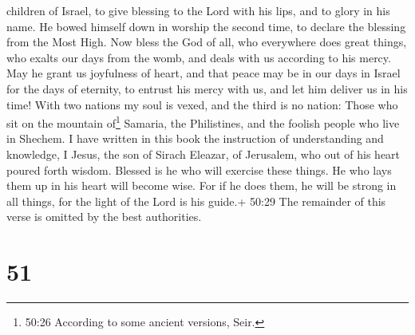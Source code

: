 children of Israel, to give blessing to the Lord with his lips, and to
glory in his name.  He bowed himself down in worship the
second time, to declare the blessing from the Most High. 
Now bless the God of all, who everywhere does great things, who exalts
our days from the womb, and deals with us according to his mercy.
 May he grant us joyfulness of heart, and that peace may be
in our days in Israel for the days of eternity,  to entrust
his mercy with us, and let him deliver us in his time! 
With two nations my soul is vexed, and the third is no nation:
 Those who sit on the mountain of\footnote{50:26 According
  to some ancient versions, Seir.} Samaria, the Philistines, and the
foolish people who live in Shechem.  I have written in this
book the instruction of understanding and knowledge, I Jesus, the son of
Sirach Eleazar, of Jerusalem, who out of his heart poured forth wisdom.
 Blessed is he who will exercise these things. He who lays
them up in his heart will become wise.  For if he does
them, he will be strong in all things, for the light of the Lord is his
guide.+ 50:29 The remainder of this verse is omitted by the best
authorities.

\hypertarget{section-36}{%
\section{51}\label{section-36}}

